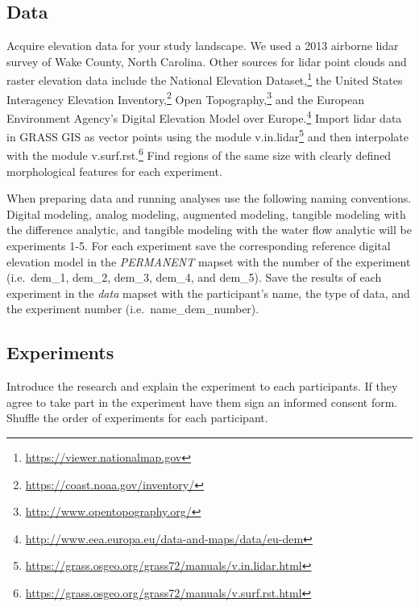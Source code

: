 \documentclass[prodmode,acmtochi]{acmsmall} %
\begin{document}
\subsection{Data}\label{appendix:data}
Acquire elevation data for your study landscape.
We used a 2013 airborne lidar survey of Wake County, North Carolina. 
Other sources for lidar point clouds and raster elevation data 
include the National Elevation Dataset,\footnote{
\url{https://viewer.nationalmap.gov}}
the United States Interagency Elevation Inventory,\footnote{
\url{https://coast.noaa.gov/inventory/}}
Open Topography,\footnote{
\url{http://www.opentopography.org/}}
and the European Environment Agency's
Digital Elevation Model over Europe.\footnote{
\url{http://www.eea.europa.eu/data-and-maps/data/eu-dem}}
%
Import lidar data in GRASS GIS as vector points using the module v.in.lidar\footnote{
\url{https://grass.osgeo.org/grass72/manuals/v.in.lidar.html}}
and then interpolate with the module v.surf.rst.\footnote{
\url{https://grass.osgeo.org/grass72/manuals/v.surf.rst.html}}
%
Find regions of the same size with clearly defined morphological features 
for each experiment. 

When preparing data and running analyses use the following naming conventions.
%
Digital modeling,
analog modeling,
augmented modeling,
tangible modeling with the difference analytic,
and tangible modeling with the water flow analytic
will be experiments 1-5.
%
For each experiment 
save the corresponding reference digital elevation model
in the \emph{PERMANENT} mapset 
with the number of the experiment 
(i.e.~dem{\_}1, 
dem{\_}2, 
dem{\_}3, 
dem{\_}4, 
and dem{\_}5).
%
Save the results of each experiment in the \emph{data} mapset
with the participant's name, the type of data, and the experiment number
(i.e.~name{\_}dem{\_}number).

\subsection{Experiments}\label{appendix:experiments}
Introduce the research and explain the experiment to each participants. 
If they agree to take part in the experiment have them sign an informed consent form. Shuffle the order of experiments for each participant.
%
\end{document}
